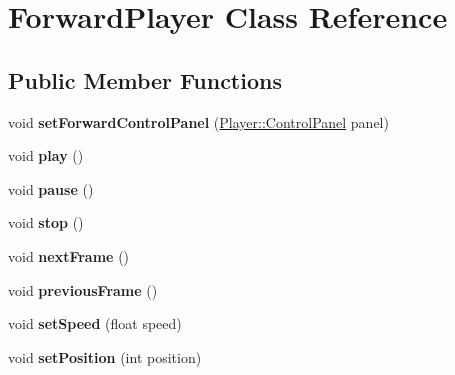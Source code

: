 \hypertarget{classForwardPlayer}{}\section{Forward\+Player Class Reference}
\label{classForwardPlayer}
\subsection*{Public Member Functions}
\begin{DoxyCompactItemize}
\item 
\hypertarget{classForwardPlayer_a6b92c080a09c2e9ba8ab269ba79a2b1b}{}void {\bfseries set\+Forward\+Control\+Panel} (\hyperlink{classPlayer_1_1ControlPanel}{Player\+::\+Control\+Panel} panel)\label{classForwardPlayer_a6b92c080a09c2e9ba8ab269ba79a2b1b}

\item 
\hypertarget{classForwardPlayer_a6d58098c6cf63c241ed03bc797256bb1}{}void {\bfseries play} ()\label{classForwardPlayer_a6d58098c6cf63c241ed03bc797256bb1}

\item 
\hypertarget{classForwardPlayer_a7167f5c196fc5e167bfabde1a730e81d}{}void {\bfseries pause} ()\label{classForwardPlayer_a7167f5c196fc5e167bfabde1a730e81d}

\item 
\hypertarget{classForwardPlayer_a8c528baf37154d347366083f0f816846}{}void {\bfseries stop} ()\label{classForwardPlayer_a8c528baf37154d347366083f0f816846}

\item 
\hypertarget{classForwardPlayer_a365329da56f8b07f8c95027ba967bbc3}{}void {\bfseries next\+Frame} ()\label{classForwardPlayer_a365329da56f8b07f8c95027ba967bbc3}

\item 
\hypertarget{classForwardPlayer_a3c96ed37c70ebc0b32c527a04e1536d1}{}void {\bfseries previous\+Frame} ()\label{classForwardPlayer_a3c96ed37c70ebc0b32c527a04e1536d1}

\item 
\hypertarget{classForwardPlayer_a5466c67c5ec22359c0702dc4ac8ffb19}{}void {\bfseries set\+Speed} (float speed)\label{classForwardPlayer_a5466c67c5ec22359c0702dc4ac8ffb19}

\item 
\hypertarget{classForwardPlayer_a1aa68f77243229daea38d59bc5145d35}{}void {\bfseries set\+Position} (int position)\label{classForwardPlayer_a1aa68f77243229daea38d59bc5145d35}


\end{DoxyCompactItemize}
